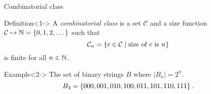 \begin{frame}{Combinatorial class}
    \begin{block}{Definition}<1->
        A \emph{combinatorial class} is a set $\mathcal{C}$ and a size function $\mathcal{C} \mapsto \mathbb{N} = \left\{0,1,2,\dotsc\right\}$ such that
\[
    \mathcal{C}_n = \left\{c \in \mathcal{C} \mid \text{size of $c$ is $n$}\right\}
\]
is finite for all $n\in\mathbb{N}$.
    \end{block}
    \begin{block}{Example}<2->
        The set of binary strings $B$ where $|B_n|=2^n$.
        \[
            B_3 = \left\{000,001,010,100,011,101,110,111\right\}.
        \]
    \end{block}
\end{frame}
